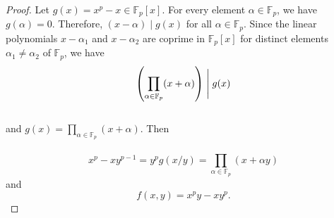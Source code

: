 \documentclass[10pt,a4paper]{amsart}
\begin{document}
\begin{proof}
Let $g(x)=x^p-x \in \mathbb{F}_{p}[x]$. For every element $\alpha \in \mathbb{F}_{p}$, we have $g(\alpha)=0$. Therefore, $(x-\alpha) \mid g(x)$ for all $\alpha \in \mathbb{F}_{p}$. Since the linear polynomials $x-\alpha_1$ and $x-\alpha_2$ are coprime in $\mathbb{F}_p[x]$ for distinct elements $\alpha_1 \neq \alpha_2$ of $\mathbb{F}_p$, we have \\
\[
\left(\prod\limits_{\alpha \in \mathbb{F}_p} (x+\alpha ) \right) \Biggm| g(x)  
\] \text{}\\ and $g(x)=\prod\limits_{\alpha \in \mathbb{F}_p} (x+\alpha)$. Then \\\\
\[
x^p-xy^{p-1}=y^pg(x/y)=\prod\limits_{\alpha \in \mathbb{F}_p} (x+\alpha y) 
\] and 
\[
f(x,y)=x^p y- xy^p.
\]
\end{proof}
\end{document}
